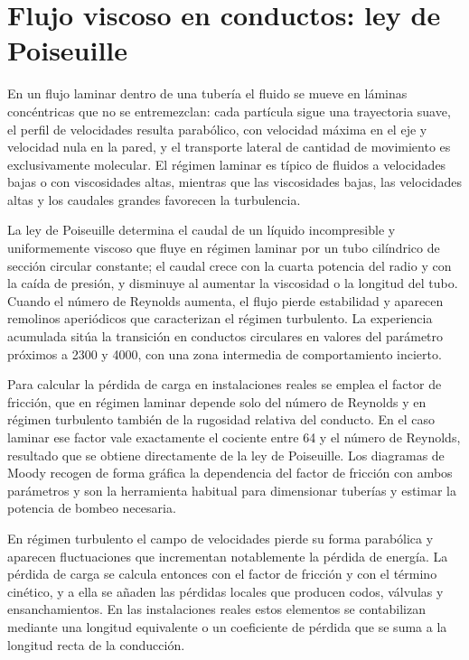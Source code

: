 \documentclass{book}
\begin{document}
\chapter{Flujo viscoso en conductos: ley de Poiseuille}

En un flujo laminar dentro de una tubería el fluido se mueve en láminas concéntricas que no se entremezclan: cada partícula sigue una trayectoria suave, el perfil de velocidades resulta parabólico, con velocidad máxima en el eje y velocidad nula en la pared, y el transporte lateral de cantidad de movimiento es exclusivamente molecular. El régimen laminar es típico de fluidos a velocidades bajas o con viscosidades altas, mientras que las viscosidades bajas, las velocidades altas y los caudales grandes favorecen la turbulencia.

La ley de Poiseuille determina el caudal de un líquido incompresible y uniformemente viscoso que fluye en régimen laminar por un tubo cilíndrico de sección circular constante; el caudal crece con la cuarta potencia del radio y con la caída de presión, y disminuye al aumentar la viscosidad o la longitud del tubo. Cuando el número de Reynolds aumenta, el flujo pierde estabilidad y aparecen remolinos aperiódicos que caracterizan el régimen turbulento. La experiencia acumulada sitúa la transición en conductos circulares en valores del parámetro próximos a 2300 y 4000, con una zona intermedia de comportamiento incierto.

Para calcular la pérdida de carga en instalaciones reales se emplea el factor de fricción, que en régimen laminar depende solo del número de Reynolds y en régimen turbulento también de la rugosidad relativa del conducto. En el caso laminar ese factor vale exactamente el cociente entre 64 y el número de Reynolds, resultado que se obtiene directamente de la ley de Poiseuille. Los diagramas de Moody recogen de forma gráfica la dependencia del factor de fricción con ambos parámetros y son la herramienta habitual para dimensionar tuberías y estimar la potencia de bombeo necesaria.

En régimen turbulento el campo de velocidades pierde su forma parabólica y aparecen fluctuaciones que incrementan notablemente la pérdida de energía. La pérdida de carga se calcula entonces con el factor de fricción y con el término cinético, y a ella se añaden las pérdidas locales que producen codos, válvulas y ensanchamientos. En las instalaciones reales estos elementos se contabilizan mediante una longitud equivalente o un coeficiente de pérdida que se suma a la longitud recta de la conducción.
\end{document}
